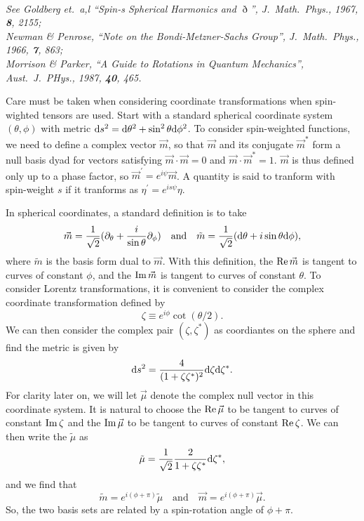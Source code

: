 \documentclass[11pt]{article}
\begin{document}
\newpage
{}\\ {\em See Goldberg et.\ a,l
  ``Spin-s Spherical Harmonics and $\eth$'', J.\ Math.\ Phys., 1967,
  {\bf 8}, 2155;\\ Newman \& Penrose, ``Note on the
  Bondi-Metzner-Sachs Group'', J.\ Math.\ Phys., 1966, {\bf 7}, 863;\\
  Morrison \& Parker, ``A Guide to Rotations in Quantum Mechanics'',
  Aust.\ J.\ PHys., 1987, {\bf 40}, 465.}
\vspace{0.25in}

Care must be taken when considering coordinate transformations when
spin-wighted tensors are used.  Start with a standard spherical
coordinate system $(\theta,\phi)$ with metric ${\rm d}s^2={\rm
  d}\theta^2+\sin^2\theta{\rm d}\phi^2$.  To consider spin-weighted
functions, we need to define a complex vector $\vec{m}$, so that
$\vec{m}$ and its conjugate $\vec{m}^*$ form a null basis dyad for
vectors satisfying $\vec{m}\cdot\vec{m}=0$ and
$\vec{m}\cdot\vec{m}^*=1$.  $\vec{m}$ is thus defined only up to a
phase factor, so $\vec{m}^\prime=e^{i\psi}\vec{m}$.  A quantity is
said to tranform with spin-weight $s$ if it tranforms as
$\eta^\prime=e^{is\psi}\eta$.

In spherical coordinates, a standard definition is to take
\begin{equation}
  \vec{m} = \frac1{\sqrt2}(\partial_\theta + \frac{i}{\sin\theta}\partial_\phi)
\quad\mbox{and}\quad
  \tilde{m} = \frac1{\sqrt2}({\rm d}\theta + i\sin\theta{\rm d}\phi),
\end{equation}
where $\tilde{m}$ is the basis form dual to $\vec{m}$.  With this
definition, the ${\rm Re}\,\vec{m}$ is tangent to curves of constant
$\phi$, and the ${\rm Im}\,\vec{m}$ is tangent to curves of constant
$\theta$.  To consider Lorentz transformations, it is convenient to
consider the complex coordinate transformation defined by
\begin{equation}
  \zeta\equiv e^{i\phi}\cot(\theta/2).
\end{equation}
We can then consider the complex pair $(\zeta,\zeta^*)$ as coordiantes
on the sphere and find the metric is given by
\begin{equation}
{\rm d}s^2 = \frac4{(1+\zeta\zeta^*)^2}{\rm d}\zeta{\rm d}\zeta^*.
\end{equation}
For clarity later on, we will let $\vec\mu$ denote the complex null
vector in this coordinate system.  It is natural to choose the ${\rm
  Re}\,\vec\mu$ to be tangent to curves of constant ${\rm Im}\,\zeta$
and the ${\rm Im}\,\vec\mu$ to be tangent to curves of constant ${\rm
  Re}\,\zeta$.  We can then write the $\tilde\mu$ as
\begin{equation}
  \tilde\mu = \frac1{\sqrt2}\frac2{1+\zeta\zeta^*}{\rm d}\zeta^*,
\end{equation}
and we find that
\begin{equation}
  \tilde{m} = e^{i(\phi+\pi)}\tilde\mu
\quad\mbox{and}\quad \vec{m} = e^{i(\phi+\pi)}\vec\mu.
\end{equation}
So, the two basis sets are related by a spin-rotation angle of $\phi+\pi$.
\end{document}
